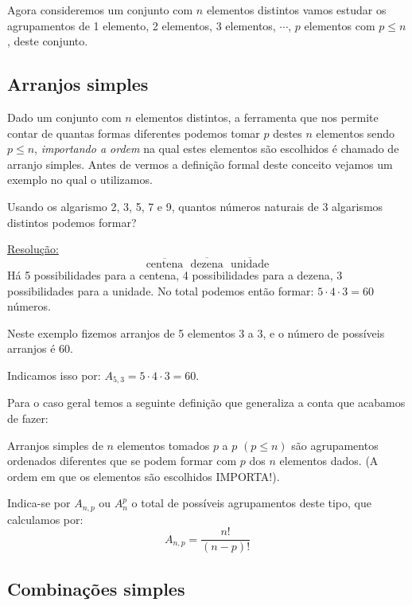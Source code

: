 Agora consideremos um conjunto com $n$ elementos distintos vamos estudar os agrupamentos de 1 elemento, 2 elementos, 3 elementos, $\cdots$, $p$ elementos com $p \leqslant n$, deste conjunto.

\subsection{Arranjos simples}

Dado um conjunto com $n$ elementos distintos, a ferramenta que nos permite contar de quantas formas diferentes podemos tomar $p$ destes $n$ elementos sendo $p \leq n$, \textit{importando a ordem} na qual estes elementos são escolhidos é chamado de arranjo simples. Antes de vermos a definição formal deste conceito vejamos um exemplo no qual o utilizamos.

\begin{exem}
 Usando os algarismo 2, 3, 5, 7 e 9, quantos números naturais de 3 algarismos distintos podemos formar?
 
 \underline{Resolução:}
 \[\overline{\text{centena}} \ \ \ \overline{\text{dezena}} \ \ \  \overline{\text{unidade}} \]
  Há 5 possibilidades para a centena, 4 possibilidades para a dezena, 3 possibilidades para a unidade. No total podemos então formar: $5 \cdot 4 \cdot 3= 60$ números.
  
  Neste exemplo fizemos arranjos de 5 elementos 3 a 3, e o número de possíveis arranjos é 60.
  
  Indicamos isso por: $A_{5, 3}= 5 \cdot 4 \cdot 3= 60$.
\end{exem}

Para o caso geral temos a seguinte definição que generaliza a conta que acabamos de fazer:

\vskip0.3cm
 \colorbox{azul}{
 \begin{minipage}{14.5cm}
 \begin{center}
  Arranjos simples de $n$ elementos tomados $p$ a $p$ $(p \leqslant n)$ são agrupamentos ordenados diferentes que se podem formar com $p$ dos $n$ elementos dados. (A ordem em que os elementos são escolhidos IMPORTA!).
 
 Indica-se por $A_{n, p}$ ou $A_{n}^{p}$ o total de possíveis agrupamentos deste tipo, que calculamos por:
 \[A_{n, p}= \frac{n!}{(n-p)!}\]
 \end{center}
 \end{minipage}}
 \vskip0.3cm


\subsection{Combinações simples}

